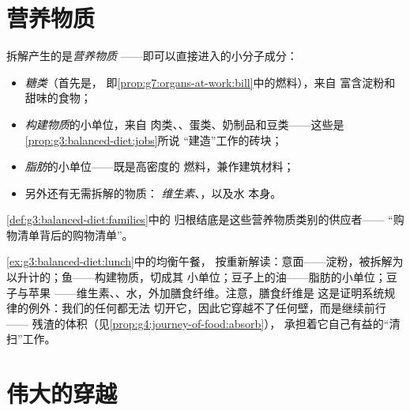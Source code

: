 \section{营养物质}

\begin{definition}[营养物质的类别]\label{def:g7:digestion-and-nutrients:families}
拆解产生的是\emph{营养物质}
——即可以直接进入的小分子成分：
\begin{itemize}
  \item \emph{糖类}（首先是，
        即\cref{prop:g7:organs-at-work:bill}中的燃料），来自
        富含淀粉和甜味的食物；
  \item \emph{构建物质}的小单位，来自
        肉类、、蛋类、奶制品和豆类——这些是
        \cref{prop:g3:balanced-diet:jobs}所说
        “建造”工作的砖块；
  \item \emph{脂肪}的小单位——既是高密度的
        燃料，兼作建筑材料；
  \item 另外还有无需拆解的物质：
        \emph{维生素}、\emph{}，以及水
        本身。
\end{itemize}
\cref{def:g3:balanced-diet:families}中的
归根结底是这些营养物质类别的供应者——
“购物清单背后的购物清单”。
\end{definition}

\begin{example}\label{ex:g7:digestion-and-nutrients:lunch}
\cref{ex:g3:balanced-diet:lunch}中的均衡午餐，
按重新解读：意面——淀粉，被拆解为
以升计的；鱼——构建物质，切成其
小单位；豆子上的油——脂肪的小单位；豆子与苹果
——维生素、、水，外加膳食纤维。注意，膳食纤维是
这是证明系统规律的例外：我们的任何都无法
切开它，因此它穿越不了任何壁，而是继续前行——
残渣的体积（见\cref{prop:g4:journey-of-food:absorb}），
承担着它自己有益的“清扫”工作。
\end{example}

\section{伟大的穿越}

